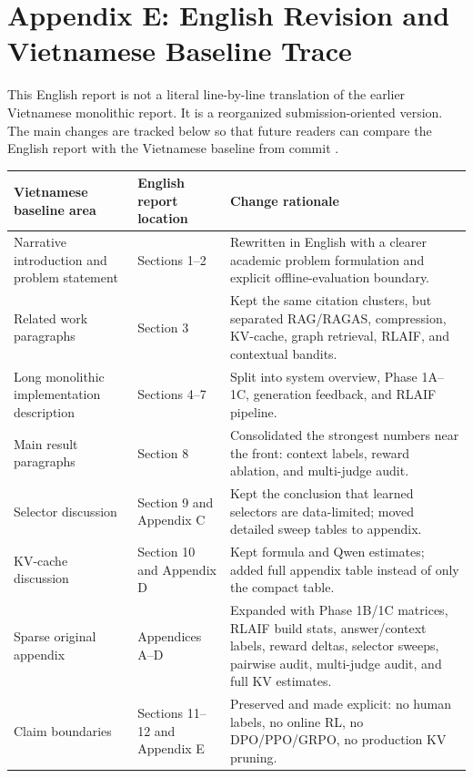 \section{Appendix E: English Revision and Vietnamese Baseline Trace}

This English report is not a literal line-by-line translation of the earlier Vietnamese monolithic report. It is a reorganized submission-oriented version. The main changes are tracked below so that future readers can compare the English report with the Vietnamese baseline from commit .

\begin{longtable}{>{\raggedright\arraybackslash}p{3.7cm} >{\raggedright\arraybackslash}p{4.6cm} >{\raggedright\arraybackslash}p{5.2cm}}
\toprule
Vietnamese baseline area & English report location & Change rationale \\
\midrule
Narrative introduction and problem statement & Sections 1--2 & Rewritten in English with a clearer academic problem formulation and explicit offline-evaluation boundary. \\
Related work paragraphs & Section 3 & Kept the same citation clusters, but separated RAG/RAGAS, compression, KV-cache, graph retrieval, RLAIF, and contextual bandits. \\
Long monolithic implementation description & Sections 4--7 & Split into system overview, Phase 1A--1C, generation feedback, and RLAIF pipeline. \\
Main result paragraphs & Section 8 & Consolidated the strongest numbers near the front: context labels, reward ablation, and multi-judge audit. \\
Selector discussion & Section 9 and Appendix C & Kept the conclusion that learned selectors are data-limited; moved detailed sweep tables to appendix. \\
KV-cache discussion & Section 10 and Appendix D & Kept formula and Qwen estimates; added full appendix table instead of only the compact table. \\
Sparse original appendix & Appendices A--D & Expanded with Phase 1B/1C matrices, RLAIF build stats, answer/context labels, reward deltas, selector sweeps, pairwise audit, multi-judge audit, and full KV estimates. \\
Claim boundaries & Sections 11--12 and Appendix E & Preserved and made explicit: no human labels, no online RL, no DPO/PPO/GRPO, no production KV pruning. \\
\bottomrule
\end{longtable}


